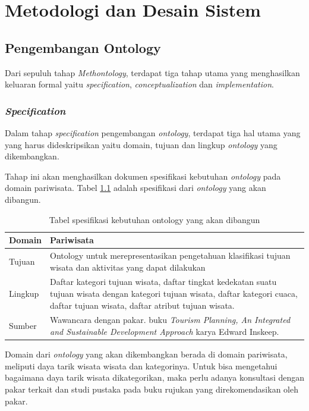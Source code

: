 \chapter{Metodologi dan Desain Sistem}

\section{Pengembangan Ontology}
Dari sepuluh tahap \textit{Methontology}, terdapat tiga tahap utama yang menghasilkan keluaran formal 
yaitu \textit{specification}, \textit{conceptualization} dan \textit{implementation}.
\par

\subsection{\textit{Specification}}
Dalam tahap \textit{specification} pengembangan \textit{ontology}, terdapat tiga hal utama yang yang harus dideskripsikan yaitu domain, tujuan dan lingkup \textit{ontology}
yang dikembangkan.
\par
Tahap ini akan menghasilkan dokumen spesifikasi kebutuhan \textit{ontology} pada domain pariwisata. Tabel \ref{table:ont-spec} adalah spesifikasi dari \textit{ontology} yang akan dibangun.

\begin{table}[h]
\begin{center}
\begin{tabular}{ |l|m{12cm}| } 
\hline
	Domain & Pariwisata \\
	\hline
	Tujuan & Ontology untuk merepresentasikan pengetahuan klasifikasi tujuan wisata dan aktivitas yang dapat dilakukan\\
	\hline
	Lingkup & Daftar kategori tujuan wisata, daftar tingkat kedekatan suatu tujuan wisata dengan kategori tujuan wisata, daftar kategori cuaca, daftar tujuan wisata,
	daftar atribut tujuan wisata. \\ 
	\hline
	Sumber & Wawancara dengan pakar. \newline 
	buku \textit{Tourism Planning, An Integrated and Sustainable Development Approach} karya Edward Inskeep. \\
	\hline
\end{tabular}
\end{center}
\caption{Tabel spesifikasi kebutuhan ontology yang akan dibangun}
\label{table:ont-spec}
\end{table}

Domain dari \textit{ontology} yang akan dikembangkan berada di domain pariwisata, meliputi daya tarik wisata wisata dan kategorinya. Untuk bisa mengetahui bagaimana daya tarik wisata dikategorikan,
maka perlu adanya konsultasi dengan pakar terkait dan studi pustaka pada buku rujukan yang direkomendasikan oleh pakar.

